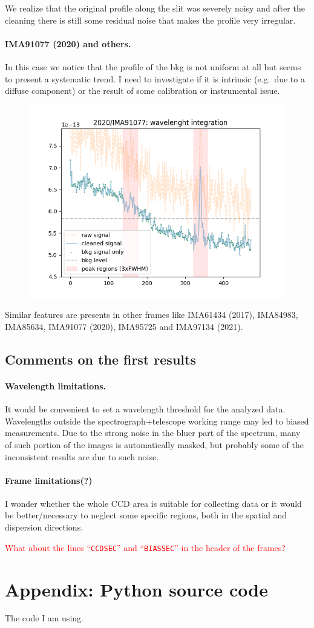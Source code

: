 \documentclass{article}
\begin{document}
We realize that the original profile along the slit was severely noisy and after the cleaning there is still some residual noise that makes the profile very irregular.

\paragraph{IMA91077 (2020) and others.} In this case we notice that the profile of the bkg is not uniform at all but seems to present a systematic trend. I need to investigate if it is intrinsic (e.g.\ due to a diffuse component) or the result of some calibration or instrumental issue.
\begin{figure}[h!]
		\centering
		\includegraphics[width=.49\textwidth]{2020_IMA91077}
\end{figure}
Similar features are presents in other frames like IMA61434 (2017), IMA84983, IMA85634, IMA91077 (2020), IMA95725 and IMA97134 (2021).

\subsection{Comments on the first results}

\paragraph{Wavelength limitations.} It would be convenient to set a wavelength threshold for the analyzed data. Wavelengths outside the spectrograph+telescope working range may led to biased measurements. Due to the strong noise in the bluer part of the spectrum, many of such portion of the images is automatically masked, but probably some of the inconsistent results are due to such noise.

\paragraph{Frame limitations(?)} I wonder whether the whole CCD area is suitable for collecting data or it would be better/necessary to neglect some specific regions, both in the spatial and dispersion directions.

\textcolor{red}{What about the lines ``\texttt{CCDSEC}'' and ``\texttt{BIASSEC}'' in the header of the frames?}

\newpage
\section{Appendix: Python source code}
The code I am using.

\end{document}
